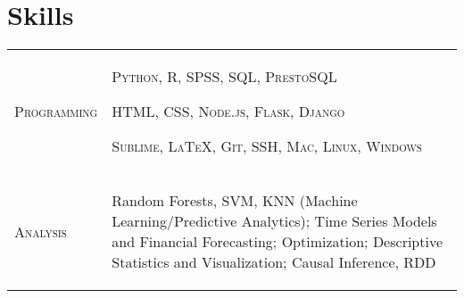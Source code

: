\documentclass[a4paper,10pt]{article}
\begin{document}
\smallskip
\section{Skills}
\begin{supertabular}{p{3.4cm} p{13.9cm}}

	\textsc{Programming}		& \begin{enumerate*}[label =$\diamond$, itemjoin={\newline}]
																\item \small \textsc{Python, R, SPSS, SQL, PrestoSQL}
																\item \small \textsc{HTML, CSS, Node.js, Flask, Django}
																\item \small \textsc{Sublime, {\fb \LaTeX}, Git, SSH, Mac, Linux, Windows }
																\end{enumerate*} \vspace{2mm} \\


	\textsc{Analysis}				& \begin{enumerate*}[label =$\diamond$, itemjoin={\newline}]
                                \item \small Random Forests, SVM, KNN (Machine Learning/Predictive Analytics); Time Series Models and Financial Forecasting; Optimization; Descriptive Statistics and Visualization; Causal Inference, RDD \end{enumerate*}  \vspace{1mm} \\



\end{supertabular}




\smallskip
\end{document}
